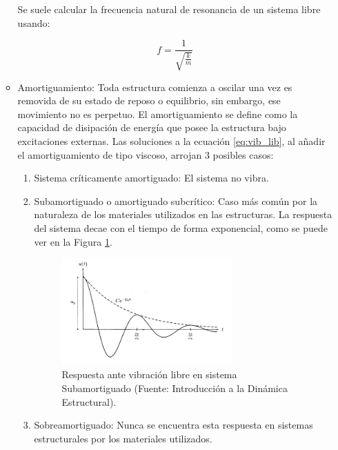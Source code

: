 \begin{itemize}
\begin{itemize}
                Se suele calcular la frecuencia natural de resonancia de un sistema libre usando:

                \begin{equation}
                    f =  \frac{1}{\sqrt{\frac{k}{m}}}
                \end{equation}

            \item Amortiguamiento: Toda estructura comienza a oscilar una vez es removida de su estado de reposo o equilibrio, sin embargo, ese movimiento no es perpetuo. El amortiguamiento se define como la capacidad de disipación de energía que posee la estructura bajo excitaciones externas. Las soluciones a la ecuación \ref{eq:vib_lib}, al añadir el amortiguamiento de tipo viscoso, arrojan 3 posibles casos:
                \begin{enumerate}
                    \item Sistema críticamente amortiguado: El sistema no vibra.
                    \item Subamortiguado o amortiguado subcrítico: Caso más común por la naturaleza de los materiales utilizados en las estructuras. La respuesta del sistema decae con el tiempo de forma exponencial, como se puede ver en la Figura \ref{fig:resp_subamorti}. 
                    
                    \begin{figure}[H]
                        \centering
                        \includegraphics[width = 0.7\textwidth]{imagenes/cap1_marcoteo/respuesta_sist_subamorti.png}
                        \caption{Respuesta ante vibración libre en sistema Subamortiguado (Fuente: Introducción a la Dinámica Estructural).}
                        \label{fig:resp_subamorti}
                    \end{figure}

                    \item Sobreamortiguado: Nunca se encuentra esta respuesta en sistemas estructurales por los materiales utilizados.
                \end{enumerate}
            
        \end{itemize}        
\end{itemize}

